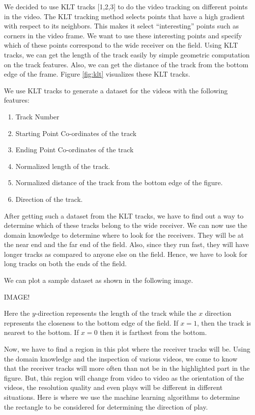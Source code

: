 \documentclass{article} %
\begin{document}
We decided to use KLT tracks [1,2,3] to do the video tracking on different points in the video. The KLT tracking method selects points that have a high gradient with respect to its neighbors. This makes it select ``interesting'' points such as corners in the video frame. We want to use these interesting points and specify which of these points correspond to the wide receiver on the field. Using KLT tracks, we can get the length of the track easily by simple geometric computation on the track features. Also, we can get the distance of the track from the bottom edge of the frame. Figure \ref{fig:klt} visualizes these KLT tracks.

We use KLT tracks to generate a dataset for the videos with the following features:

\begin{enumerate}
	\item Track Number
	\item Starting Point Co-ordinates of the track
	\item Ending Point Co-ordinates of the track
	\item Normalized length of the track.
	\item Normalized distance of the track from the bottom edge of the figure.
	\item Direction of the track.
\end{enumerate}

After getting such a dataset from the KLT tracks, we have to find out a way to determine which of these tracks belong to the wide receiver. We can now use the domain knowledge to determine where to look for the receivers. They will be at the near end and the far end of the field. Also, since they run fast, they will have longer tracks as compared to anyone else on the field. Hence, we have to look for long tracks on both the ends of the field.

We can plot a sample dataset as shown in the following image.

IMAGE!

Here the $y$-direction represents the length of the track while the $x$ direction represents the closeness to the bottom edge of the field. If $x = 1$, then the track is nearest to the bottom. If $x = 0$ then it is farthest from the bottom.

Now, we have to find a region in this plot where the receiver tracks will be. Using the domain knowledge and the inspection of various videos, we come to know that the receiver tracks will more often than not be in the highlighted part in the figure. But, this region will change from video to video as the orientation of the videos, the resolution quality and even plays will be different in different situations. Here is where we use the machine learning algorithms to determine the rectangle to be considered for determining the direction of play. 
\end{document}
